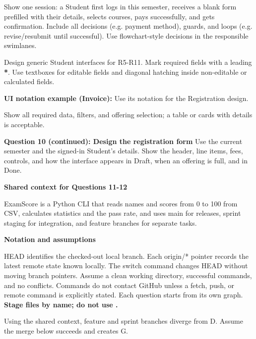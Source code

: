 \newpage
{}
Show one session: a Student first logs in this semester, receives a blank form prefilled with their details, selects courses, pays successfully, and gets confirmation. Include all decisions (e.g. payment method), guards, and loops (e.g. revise/resubmit until successful). Use flowchart-style decisions in the responsible swimlanes.\par
\registrationActivitySkeleton
\newpage
{}
Design generic Student interfaces for R5-R11. Mark required fields with a leading \textbf{*}. Use textboxes for editable fields and diagonal hatching inside non-editable or calculated fields.\par
\textbf{UI notation example (Invoice):} Use its notation for the Registration design.\par
\uiReferenceExample
{}
Show all required data, filters, and offering selection; a table or cards with details is acceptable.\par
\blankbox{14cm}
\newpage
\textbf{Question 10 (continued): Design the registration form}
Use the current semester and the signed-in Student's details. Show the header, line items, fees, controls, and how the interface appears in Draft, when an offering is full, and in Done.\par
\blankbox{21.5cm}
\newpage
\textbf{Shared context for Questions 11-12}\par
ExamScore is a Python CLI that reads names and scores from 0 to 100 from CSV, calculates statistics and the pass rate, and uses main for releases, sprint staging for integration, and feature branches for separate tasks.\par
\textbf{Notation and assumptions}\par
HEAD identifies the checked-out local branch. Each origin/* pointer records the latest remote state known locally. The switch command changes HEAD without moving branch pointers. Assume a clean working directory, successful commands, and no conflicts. Commands do not contact GitHub unless a fetch, push, or remote command is explicitly stated. Each question starts from its own graph. \textbf{Stage files by name; do not use .}\par
{}
Using the shared context, feature and sprint branches diverge from D. Assume the merge below succeeds and creates G.\par
\begin{center}\startgitMerge\end{center}
